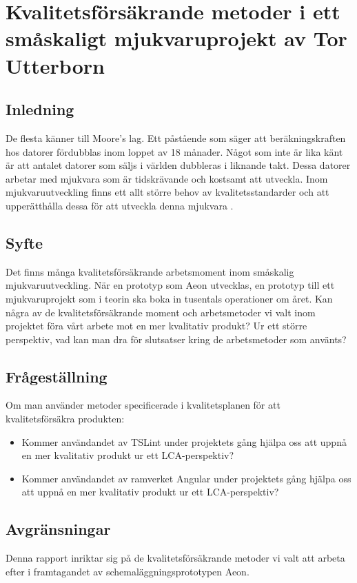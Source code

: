 \chapter{Kvalitetsförsäkrande metoder i ett småskaligt mjukvaruprojekt av Tor Utterborn}

\section{Inledning}

De flesta känner till Moore's lag. Ett påstående som säger att beräkningskraften hos datorer fördubblas inom loppet av 18 månader. 
Något som inte är lika känt är att antalet datorer som säljs i världen dubbleras i liknande takt. \cite{greenbiz}
Dessa datorer arbetar med mjukvara som är tidskrävande och kostsamt att utveckla. Inom mjukvaruutveckling finns ett allt större behov av kvalitetsstandarder och att upperätthålla dessa för att utveckla denna mjukvara \cite{linkedin}.

\section{Syfte}

Det finns många kvalitetsförsäkrande arbetsmoment inom småskalig mjukvaruutveckling. När en prototyp som Aeon utvecklas, en prototyp till ett mjukvaruprojekt som i teorin ska boka in tusentals operationer om året. Kan några av de kvalitetsförsäkrande moment och arbetsmetoder vi valt inom projektet föra vårt arbete mot en mer kvalitativ produkt? Ur ett större perspektiv, vad kan man dra för slutsatser kring de arbetsmetoder som använts?

\section{Frågeställning}

Om man använder metoder specificerade i kvalitetsplanen för att kvalitetsförsäkra produkten: 
\begin{itemize}
	\item Kommer användandet av TSLint under projektets gång hjälpa oss att uppnå en mer kvalitativ produkt ur ett LCA-perspektiv?
	\item Kommer användandet av ramverket Angular under projektets gång hjälpa oss att uppnå en mer kvalitativ produkt ur ett LCA-perspektiv?
\end{itemize}




\section{Avgränsningar}
Denna rapport inriktar sig på de kvalitetsförsäkrande metoder vi valt att arbeta efter i framtagandet av schemaläggningsprototypen Aeon.

